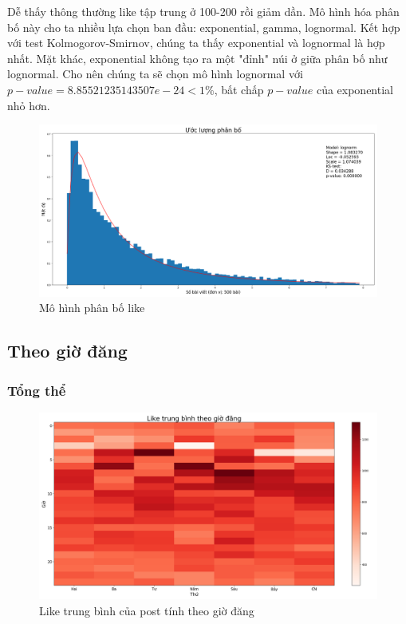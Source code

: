 \documentclass[10pt,a4paper]{article}
\begin{document}
Dễ thấy thông thường like tập trung ở 100-200 rồi giảm dần. Mô hình hóa phân bố này cho ta nhiều lựa chọn ban đầu: exponential, gamma, lognormal. Kết hợp với test Kolmogorov-Smirnov, chúng ta thấy exponential và lognormal là hợp nhất. Mặt khác, exponential không tạo ra một "đỉnh" núi ở giữa phân bố như lognormal. Cho nên chúng ta sẽ chọn mô hình lognormal với $p-value = 8.85521235143507e-24 < 1\%$, bất chấp $p-value$ của exponential nhỏ hơn.
\begin{figure}[ht]
    \centering
    \includegraphics[width=\textwidth]{img/FitLikesDistribution.png}
    \caption{Mô hình phân bố like}
    \label{fig:fitlikesdistribution}
\end{figure}

\subsection{Theo giờ đăng}
\subsubsection{Tổng thể}
\begin{figure}[ht]
    \centering
    \includegraphics[width=\textwidth]{img/MeanLikesWeekdayHour.png}
    \caption{Like trung bình của post tính theo giờ đăng}
    \label{fig:meanlikesweekdayhour}
\end{figure}
\end{document}
